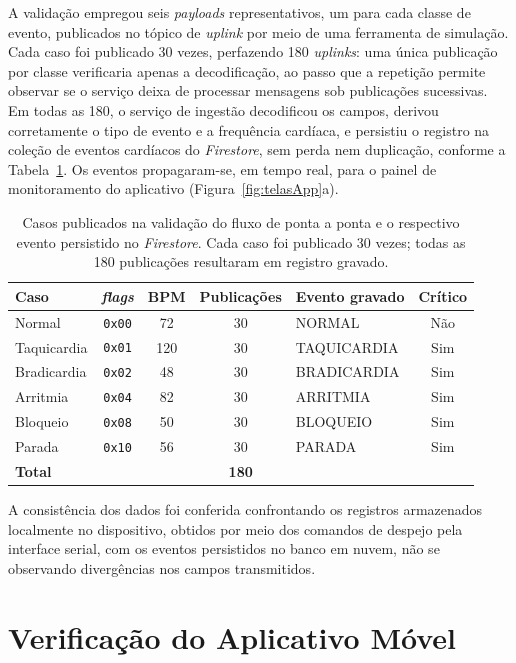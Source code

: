 A validação empregou seis \textit{payloads} representativos, um para cada classe de evento, publicados no tópico de \textit{uplink} por meio de uma ferramenta de simulação. Cada caso foi publicado 30 vezes, perfazendo 180 \textit{uplinks}: uma única publicação por classe verificaria apenas a decodificação, ao passo que a repetição permite observar se o serviço deixa de processar mensagens sob publicações sucessivas. Em todas as 180, o serviço de ingestão decodificou os campos, derivou corretamente o tipo de evento e a frequência cardíaca, e persistiu o registro na coleção de eventos cardíacos do \textit{Firestore}, sem perda nem duplicação, conforme a Tabela~\ref{tab:casosPipeline}. Os eventos propagaram-se, em tempo real, para o painel de monitoramento do aplicativo (Figura~\ref{fig:telasApp}a).

\begin{table}[htb]
\centering
\caption{Casos publicados na validação do fluxo de ponta a ponta e o respectivo evento persistido no \textit{Firestore}. Cada caso foi publicado 30 vezes; todas as 180 publicações resultaram em registro gravado.}
\label{tab:casosPipeline}
\begin{tabular}{l c c c l c}
\hline
\textbf{Caso} & \textbf{\textit{flags}} & \textbf{BPM} & \textbf{Publicações} & \textbf{Evento gravado} & \textbf{Crítico} \\
\hline
Normal        & \texttt{0x00} & 72  & 30 & NORMAL       & Não \\
Taquicardia   & \texttt{0x01} & 120 & 30 & TAQUICARDIA  & Sim \\
Bradicardia   & \texttt{0x02} & 48  & 30 & BRADICARDIA  & Sim \\
Arritmia      & \texttt{0x04} & 82  & 30 & ARRITMIA     & Sim \\
Bloqueio      & \texttt{0x08} & 50  & 30 & BLOQUEIO     & Sim \\
Parada        & \texttt{0x10} & 56  & 30 & PARADA       & Sim \\
\hline
\textbf{Total} & & & \textbf{180} & & \\
\hline
\end{tabular}
\end{table}

A consistência dos dados foi conferida confrontando os registros armazenados localmente no dispositivo, obtidos por meio dos comandos de despejo pela interface serial, com os eventos persistidos no banco em nuvem, não se observando divergências nos campos transmitidos.
\section{Verificação do Aplicativo Móvel}
\label{sec:resApp}

